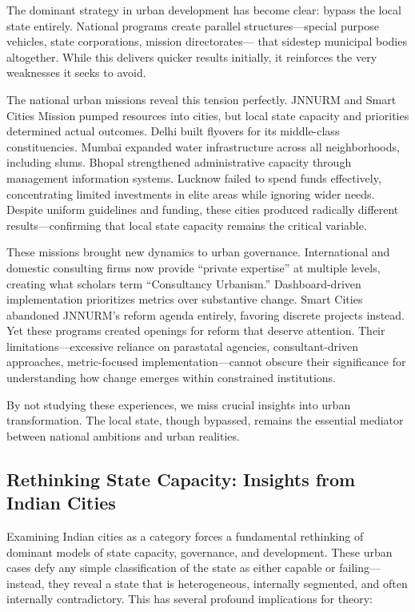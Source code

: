 The dominant strategy in urban development has become clear: bypass the local state entirely. National programs create parallel structures—special purpose vehicles, state corporations, mission directorates— that sidestep municipal bodies altogether. While this delivers quicker results initially, it reinforces the very weaknesses it seeks to avoid.

The national urban missions reveal this tension perfectly. JNNURM and Smart Cities Mission pumped resources into cities, but local state capacity and priorities determined actual outcomes. Delhi built flyovers for its middle-class constituencies. Mumbai expanded water infrastructure across all neighborhoods, including slums. Bhopal strengthened administrative capacity through management information systems. Lucknow failed to spend funds effectively, concentrating limited investments in elite areas while ignoring wider needs. Despite uniform guidelines and funding, these cities produced radically different results—confirming that local state capacity remains the critical variable.

These missions brought new dynamics to urban governance. International and domestic consulting firms now provide ``private expertise'' at multiple levels, creating what scholars term ``Consultancy Urbanism.'' Dashboard-driven implementation prioritizes metrics over substantive change. Smart Cities abandoned JNNURM's reform agenda entirely, favoring discrete projects instead. Yet these programs created openings for reform that deserve attention. Their limitations—excessive reliance on parastatal agencies, consultant-driven approaches, metric-focused implementation—cannot obscure their significance for understanding how change emerges within constrained institutions.

By not studying these experiences, we miss crucial insights into urban transformation. The local state, though bypassed, remains the essential mediator between national ambitions and urban realities.

\subsection{Rethinking State Capacity: Insights from Indian Cities}

Examining Indian cities as a category forces a fundamental rethinking of dominant models of state capacity, governance, and development. These urban cases defy any simple classification of the state as either capable or failing—instead, they reveal a state that is heterogeneous, internally segmented, and often internally contradictory. This has several profound implications for theory:

